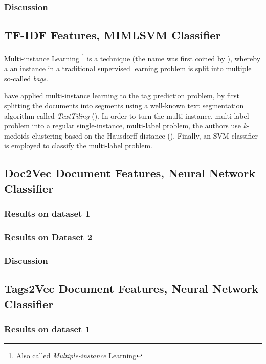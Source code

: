 \subsubsection{Discussion}

\subsection{TF-IDF Features, MIMLSVM Classifier}

Multi-instance Learning \footnote{Also called \textit{Multiple-instance} Learning} is a technique (the name was first coined by \cite{dietterich_etal_1997}), whereby a an  instance in a traditional supervised learning problem is split into multiple so-called \textit{bags}.

\cite{shen_etal_2009} have applied multi-instance learning to the tag prediction problem, by first splitting the documents into segments using a well-known text segmentation algorithm called \textit{TextTiling} (\cite{hearst_1994}). In order to turn the multi-instance, multi-label problem into a regular single-instance, multi-label problem, the authors use \textit{k}-medoids clustering based on the Hausdorff distance (\cite{edgar_2008}). Finally, an SVM classifier is employed to classify the multi-label problem.


\subsection{Doc2Vec Document Features, Neural Network Classifier}

\subsubsection{Results on dataset 1}

\subsubsection{Results on Dataset 2}

\subsubsection{Discussion}


\subsection{Tags2Vec Document Features, Neural Network Classifier}

\subsubsection{Results on dataset 1}

